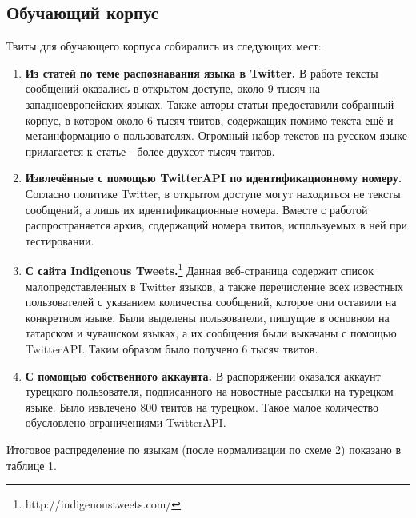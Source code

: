 \documentclass[a4paper, 14pt]{article}
\begin{document}
		\subsection{Обучающий корпус}   
			Твиты для обучающего корпуса собирались из следующих мест:
			\begin{enumerate}
				\item \textbf{Из статей по теме распознавания языка в Twitter.} В работе \cite{liga} тексты сообщений оказались в открытом доступе, около 9 тысяч на западноевропейских языках. Также авторы статьи \cite{ppm} предоставили собранный корпус, в котором около 6 тысяч твитов, содержащих помимо текста ещё и метаинформацию о пользователях. Огромный набор текстов на русском языке прилагается к статье \cite{julia} - более двухсот тысяч твитов.
				\item \textbf{Извлечённые с помощью TwitterAPI по идентификационному номеру.} Согласно политике Twitter, в открытом доступе могут находиться не тексты сообщений, а лишь их идентификационные номера. Вместе с работой \cite{lrev} распространяется архив, содержащий номера твитов, используемых в ней при тестировании. 
				\item \textbf{С сайта Indigenous Tweets.}\footnote{http://indigenoustweets.com/} Данная веб-страница содержит список малопредставленных в Twitter языков, а также перечисление всех известных пользователей с указанием количества сообщений, которое они оставили на конкретном языке. Были выделены пользователи, пишущие в основном на татарском и чувашском языках, а их сообщения были выкачаны с помощью TwitterAPI. Таким образом было получено 6 тысяч твитов.
				\item \textbf{С помощью собственного аккаунта.} В распоряжении оказался аккаунт турецкого пользователя, подписанного на новостные рассылки на турецком языке. Было извлечено 800 твитов на турецком. Такое малое количество обусловлено ограничениями TwitterAPI.
			\end{enumerate}		
			Итоговое распределение по языкам (после нормализации по схеме 2) показано в таблице 1.	  
			 
\end{document}
